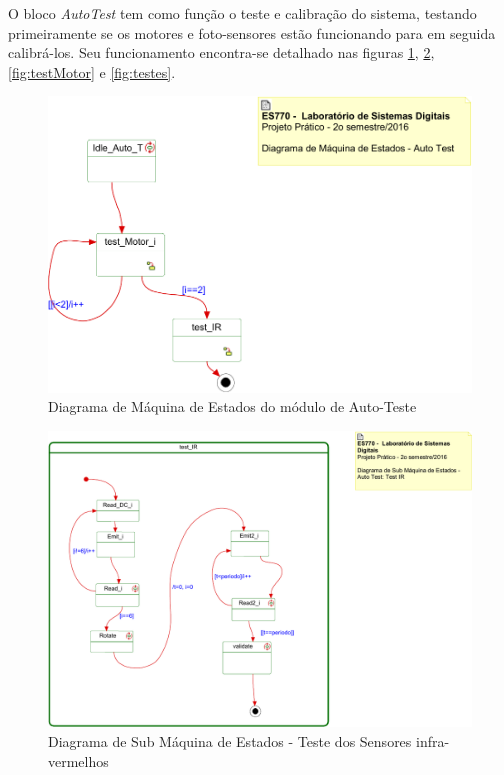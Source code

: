 \documentclass{article}
\begin{document}
O bloco \textit{AutoTest} tem como função o teste e calibração do sistema, testando primeiramente se os motores e foto-sensores estão funcionando para em seguida calibrá-los. Seu funcionamento encontra-se detalhado nas figuras \ref{fig:stateAutoTeste}, \ref{fig:testIR}, \ref{fig:testMotor} e \ref{fig:testes}.

\begin{figure}[H]
	\centering
	\includegraphics[width=0.9\linewidth]{stateAutoTeste}
	\caption{Diagrama de Máquina de Estados do módulo de Auto-Teste}
	\label{fig:stateAutoTeste}
\end{figure}
\begin{figure}[H]
	\centering
	\includegraphics[width=0.9\linewidth]{testIR}
	\caption{Diagrama de Sub Máquina de Estados - Teste dos Sensores infra-vermelhos}
	\label{fig:testIR}
\end{figure}
\end{document}
